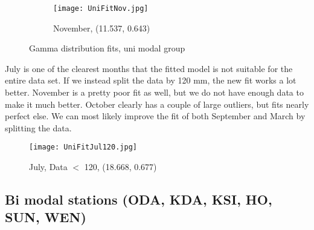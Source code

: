 \documentclass{article}
\begin{document}
		\begin{figure}[H]
			\ContinuedFloat
			\centering
			\begin{subfigure}{0.7\textwidth}
			\texttt{[image: UniFitNov.jpg]}
			\caption{November, (11.537, 0.643)}
		\end{subfigure}
		\caption{Gamma distribution fits, uni modal group}
		\end{figure}
	
	July is one of the clearest months that the fitted model is not suitable for the entire data set. If we instead split the data by 120 mm, the new fit works a lot better. November is a pretty poor fit as well, but we do not have enough data to make it much better. October clearly has a couple of large outliers, but fits nearly perfect else. We can most likely improve the fit of both September and March by splitting the data. 
	\begin{figure}[H]
		\centering
		\texttt{[image: UniFitJul120.jpg]}
		\caption{July, Data $<$ 120, (18.668, 0.677)}
	\end{figure}

	\subsection{Bi modal stations (ODA, KDA, KSI, HO, SUN, WEN)}
	
\end{document}
